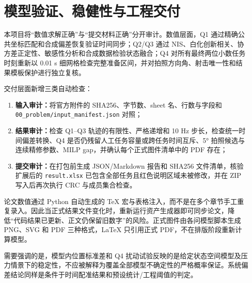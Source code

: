\section{模型验证、稳健性与工程交付}

本项目将“数值求解正确”与“提交材料正确”分开审计。数值层面，Q1 通过精确公共坐标匹配和合成偏差恢复验证时间同步；Q2/Q3 通过 NIS、白化创新相关、协方差正定性、敏感性分析和合成数据检验状态融合；Q4 对所有最终两位小数任务时刻重新以 0.01 s 细网格检查完整准备区间，并对拍照方向角、射击唯一性和结果模板保护进行独立复核。

交付层面新增三类自动检查：
\begin{enumerate}[label=(\arabic*)]
  \item \textbf{输入审计：}将官方附件的 SHA256、字节数、sheet 名、行数与字段和 \texttt{00\_problem/input\_manifest.json} 对照；
  \item \textbf{结果审计：}检查 Q1--Q3 轨迹的有限性、严格递增和 10 Hz 步长，检查统一时间偏差转换、Q4 是否仍残留人工任务容量或跨任务时间互斥、5° 拍照候选与连续精修参数、MILP gap，并确认每个正式图件清单中的 PDF 存在；
  \item \textbf{提交审计：}在打包前生成 JSON/Markdown 报告和 SHA256 文件清单，核验扩展后的 \texttt{result.xlsx} 已包含全部任务且红色说明区域未被修改，并在 ZIP 写入后再次执行 CRC 与成员集合检查。
\end{enumerate}

论文数值通过 Python 自动生成的 TeX 宏与表格注入，而不是在多个章节手工重复录入。因此当正式结果文件变化时，重新运行资产生成器即可同步论文，降低“代码结果已更新、正文仍保留旧数字”的风险。正式图件由各问模型脚本生成 PNG、SVG 和 PDF 三种格式，LaTeX 只引用正式 PDF，不在排版阶段重新计算模型。

需要强调的是，模型内位置标准差和 Q4 扰动试验反映的是给定状态空间模型及压力情景下的稳定性，不应被解释为覆盖全部模型不确定性的严格概率保证。系统偏差结论同样是条件于时间配准结果和预设统计/工程阈值的判定。